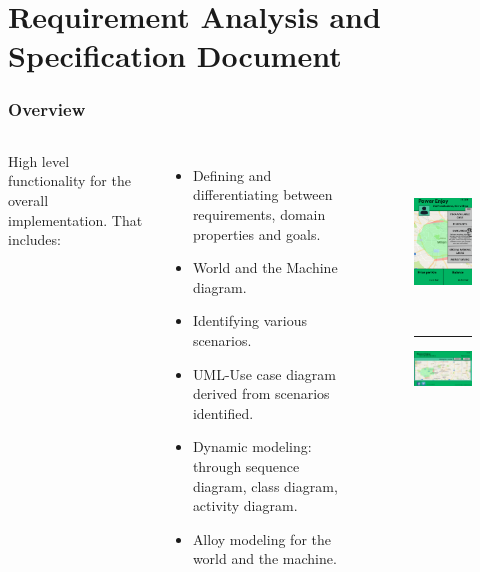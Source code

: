 \section{Requirement Analysis and Specification Document}

\begin{frame}
	\fontsize{7.5}{9}
	\frametitle{Overview}
	\begin{columns}[c]
		High level functionality for the overall implementation. That includes:
		\begin{itemize}
			\item Defining and differentiating between requirements, domain properties and goals.
			\item World and the Machine diagram.
			\item Identifying various scenarios.
			\item UML-Use case diagram derived from scenarios identified.
			\item Dynamic modeling: through sequence diagram, class diagram, activity diagram.
			\item Alloy modeling for the world and the machine.
		\end{itemize}
		
		\begin{figure}[H]
			\centering
			\includegraphics[height=4cm,keepaspectratio]{figures/mobile_logged.eps}
			\label{fig:mobile_logged}
			\textcolor{white}{\rule{\textwidth}{0cm}}
			\centering
			\includegraphics[width=4.7cm,keepaspectratio]{figures/desktop_unlogged.eps}
			\label{fig:desktop_unlogged}
		\end{figure}
	\end{columns}
\end{frame}

